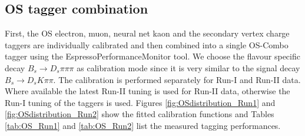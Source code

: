\subsection{OS tagger combination}
\label{subsec: OScalibration}

First, the OS electron, muon, neural net kaon and the secondary vertex charge taggers are individually calibrated and then combined into a single 
OS-Combo tagger using the \textsf{EspressoPerformanceMonitor} tool.
We choose the flavour specific decay  $B_s \to D_s \pi\pi\pi$ as calibration mode since it is very similar to the signal decay $B_s \to D_s K\pi\pi$.
The calibration is performed separately for Run-I and Run-II data.
Where available the latest Run-II tuning is used for Run-II data, otherwise the Run-I tuning of the taggers is used.
Figures \ref{fig:OSdistribution_Run1} and \ref{fig:OSdistribution_Run2} show the fitted calibration functions
and Tables \ref{tab:OS_Run1} and \ref{tab:OS_Run2} list the measured tagging performances.

